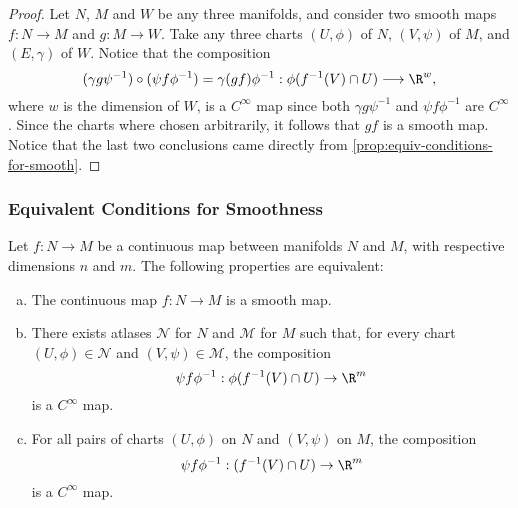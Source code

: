 \begin{proof}
Let \(N\), \(M\) and \(W\) be any three manifolds, and consider two smooth maps
\(f: N \to M\) and \(g: M \to W\). Take any three charts \((U, \phi)\) of \(N\),
\((V, \psi)\) of \(M\), and \((E, \gamma)\) of \(W\). Notice that the
composition
\[
(\gamma g \psi^{-1}) \circ (\psi f \phi^{-1})
= \gamma (g f) \phi^{-1}: \phi(f^{-1}(V) \cap U)
\longrightarrow \R^w,
\]
where \(w\) is the dimension of \(W\), is a \(C^{\infty}\) map since both
\(\gamma g \psi^{-1}\) and \(\psi f \phi^{-1}\) are \(C^{\infty}\). Since the
charts where chosen arbitrarily, it follows that \(g f\) is a smooth map. Notice
that the last two conclusions came directly from
\cref{prop:equiv-conditions-for-smooth}.
\end{proof}

\subsubsection{Equivalent Conditions for Smoothness}

\begin{proposition}
\label{prop:equiv-conditions-for-smooth}
Let \(f: N \to M\) be a continuous map between manifolds \(N\) and \(M\), with
respective dimensions \(n\) and \(m\). The following properties are equivalent:
\begin{enumerate}[(a)]\setlength\itemsep{0em}
\item The continuous map \(f: N \to M\) is a smooth map.

\item There exists atlases \(\mathcal{N}\) for \(N\) and \(\mathcal{M}\) for
  \(M\) such that, for every chart \((U, \phi) \in \mathcal{N}\) and
  \((V, \psi) \in \mathcal{M}\), the composition
  \[
  \psi f \phi^{-1}: \phi(f^{-1}(V) \cap U) \to \R^m
  \]
  is a \(C^{\infty}\) map.

\item For all pairs of charts \((U, \phi)\) on \(N\) and \((V, \psi)\) on \(M\),
  the composition
  \[
  \psi f \phi^{-1}: (f^{-1}(V) \cap U) \to  \R^m
  \]
  is a \(C^{\infty}\) map.
\end{enumerate}
\end{proposition}


